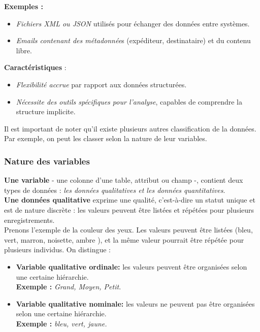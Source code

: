 \documentclass[a4paper,12pt]{article}
\begin{document}
            \textbf{Exemples :}
            \begin{itemize}
                \item \textit{Fichiers XML ou JSON} utilisés pour échanger des données entre systèmes.
                \item \textit{Emails contenant des métadonnée}s (expéditeur, destinataire) et du contenu libre.
            \end{itemize}
            
            \textbf{Caractéristiques }:
            \begin{itemize}
                \item \textit{Flexibilité accrue} par rapport aux données structurées.
                \item \textit{Nécessite des outils spécifiques pour l'analyse}, capables de comprendre la structure implicite.
            \end{itemize}

            Il est important de noter qu’il existe plusieurs autres classification de la données. Par exemple, on peut les classer selon la nature de leur variables. \\

        \subsubsection{Nature des variables}    
            \textbf{Une variable} - une colonne d'une table, attribut ou champ -, contient deux types de données : \textit{les données qualitatives et les données quantitatives}.\\

            \textbf{Une données qualitative} exprime une qualité, c'est-à-dire un statut unique et est de nature discrète : les valeurs peuvent être listées et répétées pour plusieurs enregistrements. \\ 
            
            Prenons l'exemple de la couleur des yeux. Les valeurs peuvent être listées   (bleu, vert, marron, noisette, ambre ), et la même valeur pourrait être répétée pour plusieurs individus.
            On distingue : 
            \begin{itemize}
                \item \textbf{Variable qualitative ordinale:} les valeurs peuvent être organisées selon une certaine hiérarchie.\\
                \textbf{Exemple :} \textit{Grand, Moyen, Petit}.
                \item \textbf{Variable qualitative nominale:}  les valeurs ne peuvent pas être organisées selon une certaine hiérarchie. \\
                \textbf{Exemple :} \textit{bleu, vert, jaune.}
            \end{itemize}\\
            
\end{document}
